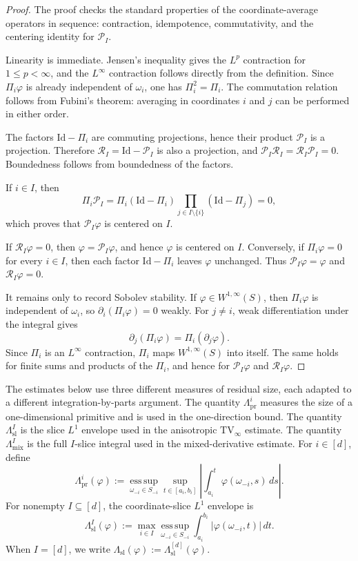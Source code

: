\documentclass[11pt,letterpaper]{article}
\theoremstyle{definition}
\theoremstyle{remark}
\newcommand{\Id}{\mathrm{Id}}
\newcommand{\TV}{\mathrm{TV}}
\begin{document}
\begin{proof}
The proof checks the standard properties of the coordinate-average operators in
sequence: contraction, idempotence, commutativity, and the centering identity
for $\mathcal P_I$.

Linearity is immediate. Jensen's inequality gives the $L^p$ contraction for
$1\le p<\infty$, and the $L^\infty$ contraction follows directly from the
definition. Since $\Pi_i\varphi$ is already independent of $\omega_i$, one has
$\Pi_i^2=\Pi_i$. The commutation relation follows from Fubini's theorem:
averaging in coordinates $i$ and $j$ can be performed in either order.

The factors $\Id-\Pi_i$ are commuting projections, hence their product
$\mathcal P_I$ is a projection. Therefore
$\mathcal R_I=\Id-\mathcal P_I$ is also a projection, and
$\mathcal P_I\mathcal R_I=\mathcal R_I\mathcal P_I=0$. Boundedness follows
from boundedness of the factors.

If $i\in I$, then
$$
\Pi_i\mathcal P_I
=
\Pi_i(\Id-\Pi_i)
\prod_{j\in I\setminus\{i\}}(\Id-\Pi_j)
=0,
$$
which proves that $\mathcal P_I\varphi$ is centered on $I$.

If $\mathcal R_I\varphi=0$, then $\varphi=\mathcal P_I\varphi$, and hence
$\varphi$ is centered on $I$. Conversely, if $\Pi_i\varphi=0$ for every
$i\in I$, then each factor $\Id-\Pi_i$ leaves $\varphi$ unchanged. Thus
$\mathcal P_I\varphi=\varphi$ and $\mathcal R_I\varphi=0$.

It remains only to record Sobolev stability. If
$\varphi\in W^{1,\infty}(S)$, then $\Pi_i\varphi$ is independent of
$\omega_i$, so $\partial_i(\Pi_i\varphi)=0$ weakly. For $j\neq i$, weak
differentiation under the integral gives
$$
\partial_j(\Pi_i\varphi)=\Pi_i(\partial_j\varphi).
$$
Since $\Pi_i$ is an $L^\infty$ contraction, $\Pi_i$ maps
$W^{1,\infty}(S)$ into itself. The same holds for finite sums and products of
the $\Pi_i$, and hence for $\mathcal P_I\varphi$ and
$\mathcal R_I\varphi$.
\end{proof}

The estimates below use three different measures of residual size, each adapted
to a different integration-by-parts argument. The quantity
$\Lambda_{\mathrm{pr}}^i$ measures the size of a one-dimensional primitive and
is used in the one-direction bound. The quantity $\Lambda_{\mathrm{sl}}^I$ is
the slice $L^1$ envelope used in the anisotropic $\TV_\infty$ estimate. The
quantity $\Lambda_{\mathrm{mix}}^I$ is the full $I$-slice integral used in the
mixed-derivative estimate. For $i\in[d]$, define
$$
\Lambda_{\mathrm{pr}}^i(\varphi)
:=
\operatorname*{ess\,sup}_{\omega_{-i}\in S_{-i}}
\sup_{t\in[a_i,b_i]}
\left|
\int_{a_i}^{t}\varphi(\omega_{-i},s)\,ds
\right|.
$$
For nonempty $I\subseteq[d]$, the coordinate-slice $L^1$ envelope is
$$
\Lambda_{\mathrm{sl}}^I(\varphi)
:=
\max_{i\in I}
\operatorname*{ess\,sup}_{\omega_{-i}\in S_{-i}}
\int_{a_i}^{b_i}|\varphi(\omega_{-i},t)|\,dt .
$$
When $I=[d]$, we write
$\Lambda_{\mathrm{sl}}(\varphi):=\Lambda_{\mathrm{sl}}^{[d]}(\varphi)$.
\end{document}
